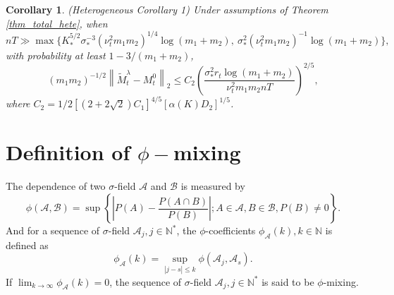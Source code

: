 \documentclass[12pt]{article}
\newtheorem{cor}{Corollary}
\begin{document}
\begin{cor}
  \label{cor_general_result_hete}
  (Heterogeneous Corollary 1)
  Under assumptions of Theorem \ref{thm_total_hete}, when 
  $$ nT\gg\max\{K_*^{5/2}\sigma_*^{-3}(\nu_t^{2}m_1m_2)^{1/4}\log(m_1+m_2),\ \sigma_*^2(\nu_t^{2}m_1m_2)^{-1}\log(m_1+m_2)\},$$
  with probability at least $1-3/(m_1+m_2)$,
  \begin{equation}\label{eq_general_bound_hete}
  (m_1m_2)^{-1/2}\left\|\widetilde{M}_t^\lambda - M_t^0\right\|_2 \le C_2\left(\frac{\sigma_*^2r_t\log(m_1+m_2)}{\nu_t^2m_1m_2 n T}\right)^{2/5},
  \end{equation}
  where $C_2 =1/2\left[(2+2\sqrt{2})C_1\right]^{4/5}\left[\alpha(K)D_2\right]^{1/5}$.
  \end{cor}




\section{Definition of $\phi-$mixing}
\label{def:phi}
The dependence of two $\sigma$-field $\mathcal{A}$ and $\mathcal{B}$ is measured by
  \begin{equation*}
    \phi(\mathcal{A},\mathcal{B}) = \sup \left\{\left|P(A) - \frac{P(A\cap B)}{P(B)}\right|;A\in \mathcal{A}, B\in \mathcal{B},P(B)\not =0 \right\}.
  \end{equation*}
  And for a sequence of $\sigma$-field $\mathcal{A}_j,j\in \mathbb{N}^*$, the $\phi$-coefficients $\phi_\mathcal{A}(k),k\in \mathbb{N}$ is defined as 
  \begin{equation*}
    \phi_{\mathcal{A}}(k) = \sup_{|j-s|\le k }\phi(\mathcal{A}_j,\mathcal{A}_s).
  \end{equation*}
  If $\lim_{k\rightarrow \infty} \phi_\mathcal{A}(k)=0$, the sequence of $\sigma$-field $\mathcal{A}_j,j\in \mathbb{N}^*$ is said to be $\phi$-mixing. 
  
\end{document}
